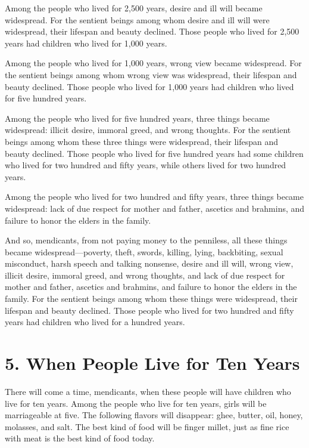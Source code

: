 \documentclass[12pt,openany]{book}%
\begin{document}
Among the people who lived for 2,500 years, desire and ill will became widespread. For the sentient beings among whom desire and ill will were widespread, their lifespan and beauty declined. Those people who lived for 2,500 years had children who lived for 1,000 years. 

Among the people who lived for 1,000 years, wrong view became widespread. For the sentient beings among whom wrong view was widespread, their lifespan and beauty declined. Those people who lived for 1,000 years had children who lived for five hundred years. 

Among the people who lived for five hundred years, three things became widespread: illicit desire, immoral greed, and wrong thoughts. For the sentient beings among whom these three things were widespread, their lifespan and beauty declined. Those people who lived for five hundred years had some children who lived for two hundred and fifty years, while others lived for two hundred years. 

Among the people who lived for two hundred and fifty years, three things became widespread: lack of due respect for mother and father, ascetics and brahmins, and failure to honor the elders in the family. 

And so, mendicants, from not paying money to the penniless, all these things became widespread—poverty, theft, swords, killing, lying, backbiting, sexual misconduct, harsh speech and talking nonsense, desire and ill will, wrong view, illicit desire, immoral greed, and wrong thoughts, and lack of due respect for mother and father, ascetics and brahmins, and failure to honor the elders in the family. For the sentient beings among whom these things were widespread, their lifespan and beauty declined. Those people who lived for two hundred and fifty years had children who lived for a hundred years. 

\section*{5. When People Live for Ten Years }

There will come a time, mendicants, when these people will have children who live for ten years. Among the people who live for ten years, girls will be marriageable at five. The following flavors will disappear: ghee, butter, oil, honey, molasses, and salt. The best kind of food will be finger millet, just as fine rice with meat is the best kind of food today. 
\end{document}
